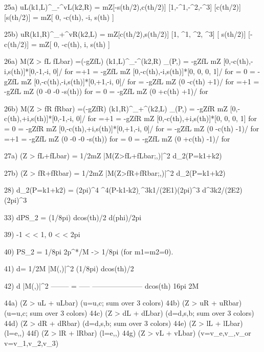 \documentclass[12pt]{article}
\def\eps{\epsilon}
\begin{document}
  25a) uL(k1,L)^\dagger \sigma_-^\mu vL(k2,R)
     = mZ[-s(th/2),c(th/2)] [1,-\sigma^1,-\sigma^2,-\sigma^3] [c(th/2)]
                                                              [s(th/2)]
     = mZ[ 0, -c(th),  -i,  s(th) ]

  25b) uR(k1,R)^\dagger \sigma_+^\mu vR(k2,L)
     = mZ[c(th/2),s(th/2)] [1, \sigma^1, \sigma^2, \sigma^3] [ s(th/2)]
                                                             [-c(th/2)]
     = mZ[ 0, -c(th),  i,  s(th) ]

  26a) M(Z > fL fLbar)
  =(-gZfL) \uL(k1,L)^\dagger \sigma_-^\mu \vL(k2,R) \eps_\mu(P,\lambda)
  = -gZfL mZ [0,-c(th),-i,s(th)]*[0,-1,-i, 0]/  for \lambda=+1
  = -gZfL mZ [0,-c(th),-i,s(th)]*[0, 0, 0, 1]/  for \lambda= 0
  = -gZfL mZ [0,-c(th),-i,s(th)]*[0,+1,-i, 0]/  for 
  = -gZfL mZ (0 -c(th) +1)/   for \lambda=+1
  = -gZfL mZ (0 -0  -0 -s(th))    for \lambda= 0
  = -gZfL mZ (0 +c(th) +1)/   for 

  26b) M(Z > fR fRbar)
  =(-gZfR) \uR(k1,R)^\dagger \sigma_+^\mu \vR(k2,L) \eps_\mu(P,\lambda)
  = -gZfR mZ [0,-c(th),+i,s(th)]*[0,-1,-i, 0]/  for \lambda=+1
  = -gZfR mZ [0,-c(th),+i,s(th)]*[0, 0, 0, 1]       for \lambda= 0
  = -gZfR mZ [0,-c(th),+i,s(th)]*[0,+1,-i, 0]/  for 
  = -gZfL mZ (0 -c(th) -1)/   for \lambda=+1
  = -gZfL mZ (0 -0  -0 -s(th))    for \lambda= 0
  = -gZfL mZ (0 +c(th) -1)/   for 

  27a) \Gamma(Z > fL+fLbar)
  = 1/2mZ \Int |M(Z>fL+fLbar;\lambda,\theta)|^2 d\PS_2(P=k1+k2)

  27b) \Gamma(Z > fR+fRbar)
  = 1/2mZ \Int |M(Z>fR+fRbar;\lambda,\theta)|^2 d\PS_2(P=k1+k2)

  28) d\PS_2(P=k1+k2)
  = (2pi)^4 \delta^4(P-k1-k2) \d^3k1/(2E1)(2pi)^3 d^3k2/(2E2)(2pi)^3

  33) dPS_2 = (1/8pi) dcos(th)/2 d(phi)/2pi

  39) -1 < \cos\theta < 1, 0 < \phi < 2pi

  40) PS_2 = 1/8pi 2p^*/M -> 1/8pi (for m1=m2=0).

  41) d\Gamma = 1/2M |M(\lambda,\theta)|^2 (1/8pi) dcos(th)/2

  42) d    |M(\lambda,\theta)|^2
      -------- = -----  ---------------------
      dcos(th)    16pi          2M

  44a) \Gamma(Z > uL + uLbar)  (u=u,c;   sum over 3 colors)
  44b) \Gamma(Z > uR + uRbar)  (u=u,c;   sum over 3 colors)
  44c) \Gamma(Z > dL + dLbar)  (d=d,s,b; sum over 3 colors)
  44d) \Gamma(Z > dR + dRbar)  (d=d,s,b; sum over 3 colors)
  44e) \Gamma(Z > lL + lLbar)  (l=e,\mu,\tau)
  44f) \Gamma(Z > lR + lRbar)  (l=e,\mu,\tau)
  44g) \Gamma(Z > vL + vLbar)  (v=v_e,v_\mu,v_\tau or v=v_1,v_2,v_3)
\end{document}
